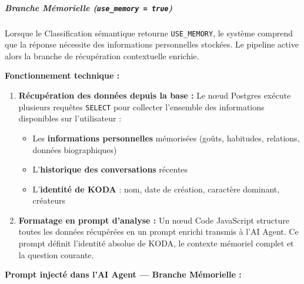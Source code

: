 \documentclass[a4paper,12pt]{report}
\begin{document}
	
	\vspace{0.8em}
	\subparagraph{Branche Mémorielle (\texttt{use\_memory = true})}
	
	\vspace{0.3em}
	
	Lorsque le Classification sémantique retourne \texttt{USE\_MEMORY}, le système comprend que la
	réponse nécessite des informations personnelles stockées. Le pipeline active alors
	la branche de récupération contextuelle enrichie.
	
	\vspace{0.5em}
	\noindent\textbf{Fonctionnement technique :}
	
	\begin{enumerate}
		
		\item \textbf{Récupération des données depuis la base :}
		Le nœud Postgres exécute plusieurs requêtes \texttt{SELECT} pour collecter
		l'ensemble des informations disponibles sur l'utilisateur :
		\begin{itemize}
			\item Les \textbf{informations personnelles} mémorisées (goûts, habitudes,
			relations, données biographiques)
			\item L'\textbf{historique des conversations} récentes
			\item L'\textbf{identité de KODA} : nom, date de création, caractère
			dominant, créateurs
		\end{itemize}
		
		\vspace{0.3em}
		
		\item \textbf{Formatage en prompt d'analyse :}
		Un nœud Code JavaScript structure toutes les données récupérées en un prompt
		enrichi transmis à l'AI Agent. Ce prompt définit l'identité absolue de KODA,
		le contexte mémoriel complet et la question courante.
		
	\end{enumerate}
	
	\vspace{0.5em}
	\noindent\textbf{Prompt injecté dans l'AI Agent — Branche Mémorielle :}
	
	\vspace{0.4em}
	
\end{document}

